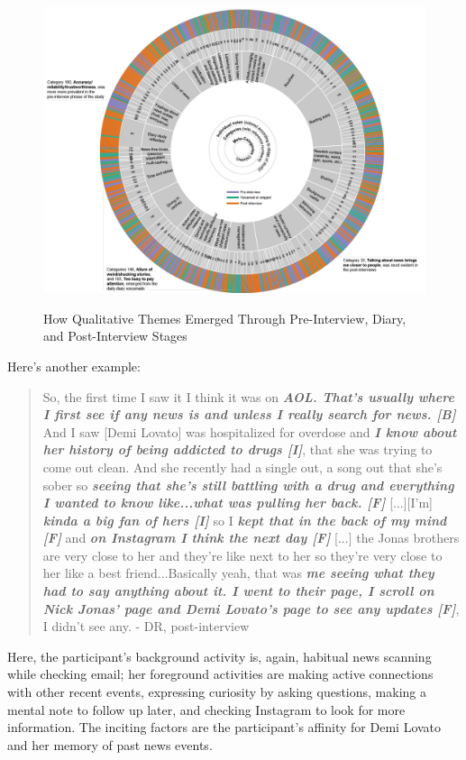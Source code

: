 \documentclass[sigchi]{acmart}
\begin{document}
\begin{figure}
  \caption{How Qualitative Themes Emerged Through Pre-Interview, Diary, and Post-Interview Stages}
  \includegraphics[width=\textwidth]{figures/circular-blocking-cleaned-nonsquare.jpg}
  \label{fig:codes-by-stage}
\end{figure}

Here’s another example:
\begin{quote}
So, the first time I saw it I think it was on \textbf{\textit{AOL. That’s usually where I first see if any news is and unless I really search for news. [B]}} And I saw [Demi Lovato] was hospitalized for overdose and \textit{\textbf{I know about her history of being addicted to drugs [I]}}, that she was trying to come out clean. And she recently had a single out, a song out that she’s sober so \textit{\textbf{seeing that she’s still battling with a drug and everything I wanted to know like...what was pulling her back. [F]}} [...][I'm] \textit{\textbf{kinda a big fan of hers [I]}} so I \textit{\textbf{kept that in the back of my mind [F]}} and \textit{\textbf{on Instagram I think the next day [F] }}[...] the Jonas brothers are very close to her and they’re like next to her so they’re very close to her like a best friend...Basically yeah, that was \textit{\textbf{me seeing what they had to say anything about it. I went to their page, I scroll on Nick Jonas' page and Demi Lovato’s page to see any updates [F]}}, I didn’t see any. - DR, post-interview
\end{quote}
Here, the participant’s background activity is, again, habitual news scanning while checking email; her foreground activities are making active connections with other recent events, expressing curiosity by asking questions, making a mental note to follow up later, and checking Instagram to look for more information. The inciting factors are the participant’s affinity for Demi Lovato and her memory of past news events.
\end{document}
